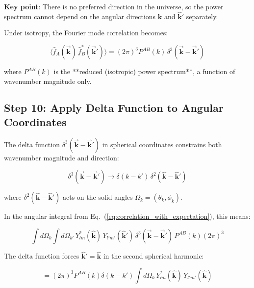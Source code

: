 \textbf{Key point}: There is no preferred direction in the universe, so the power spectrum cannot depend on the angular directions $\hat{\mathbf{k}}$ and $\hat{\mathbf{k}}'$ separately.

Under isotropy, the Fourier mode correlation becomes:

\begin{equation}
    \langle \hat{f}_A(\vec{\mathbf{k}}) \, \hat{f}_B^*(\vec{\mathbf{k}}') \rangle = (2\pi)^3 P^{AB}(k) \, \delta^3(\vec{\mathbf{k}} - \vec{\mathbf{k}}')
\label{eq:isotropic_power_spectrum}
\end{equation}

where $P^{AB}(k)$ is the **reduced (isotropic) power spectrum**, a function of wavenumber magnitude only.

\subsection{Step 10: Apply Delta Function to Angular Coordinates}

The delta function $\delta^3(\vec{\mathbf{k}} - \vec{\mathbf{k}}')$ in spherical coordinates constrains both wavenumber magnitude and direction:

\begin{equation}
    \delta^3(\vec{\mathbf{k}} - \vec{\mathbf{k}}') \rightarrow \delta(k - k') \, \delta^2(\hat{\mathbf{k}} - \hat{\mathbf{k}}')
\label{eq:delta_spherical}
\end{equation}

where $\delta^2(\hat{\mathbf{k}} - \hat{\mathbf{k}}')$ acts on the solid angles $\Omega_k = (\theta_k, \phi_k)$.

In the angular integral from Eq.~(\ref{eq:correlation_with_expectation}), this means:

\begin{equation}
    \int d\Omega_k \int d\Omega_{k'} \, Y_{lm}^*(\hat{\mathbf{k}}) \, Y_{l'm'}(\hat{\mathbf{k}}') \, \delta^3(\vec{\mathbf{k}} - \vec{\mathbf{k}}') \, P^{AB}(k) (2\pi)^3
\label{eq:angular_with_delta}
\end{equation}

The delta function forces $\hat{\mathbf{k}}' = \hat{\mathbf{k}}$ in the second spherical harmonic:

\begin{equation}
    = (2\pi)^3 P^{AB}(k) \delta(k - k') \int d\Omega_k \, Y_{lm}^*(\hat{\mathbf{k}}) \, Y_{l'm'}(\hat{\mathbf{k}})
\label{eq:angular_after_delta}
\end{equation}

